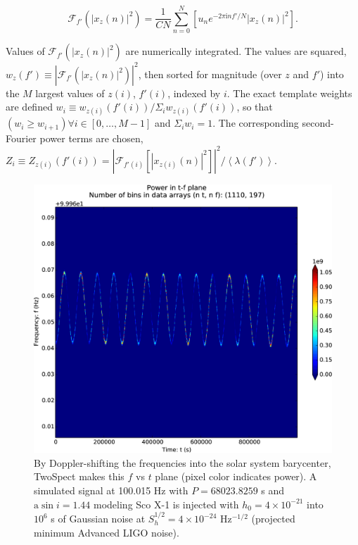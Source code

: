 \documentclass[12pt]{iopart}
\begin{document}
\begin{equation}
\mathcal{F}_{f'}(\left|x_z(n) \right|^2) = \frac{1}{CN} \sum\limits_{n=0}^N \left[u_n e^{-2\pi \mathrm{i} n f'/N} \left|x_z(n)\right|^2\right].
\label{fourier_transform_of_tfplane_power}
\end{equation}

Values of $\mathcal{F}_{f'}(\left|x_z(n) \right|^2)$ are numerically integrated.
The values are squared, $w_{z}(f') \equiv \left| \mathcal{F}_{f'}(\left|x_z(n) \right|^2) \right|^2$, then sorted for magnitude (over $z$ and $f'$) into the $M$ largest values of $z(i)$, $f'(i)$, indexed by $i$.
The exact template weights are defined $w_i \equiv w_{z(i)}\left(f'(i)\right) / \Sigma_i w_{z(i)} \left(f'(i) \right)$, so that $(w_i \geq w_{i+1}) \forall i\in [0,\ldots, M-1]$ and $\Sigma_i w_i = 1$.
The corresponding second-Fourier power terms are chosen, $Z_i \equiv Z_{z(i)}\left(f'(i)\right) = \left|\mathcal{F}_{f'(i)}[|x_{z(i)}(n)|^2] \right|^2/\left<\lambda(f') \right>$.


\begin{figure}
\begin{center}
\includegraphics[keepaspectratio,height=0.35\paperheight]{plots/tfplane-4e21-on-4e24.eps}
\caption{By Doppler-shifting the frequencies into the solar system barycenter, TwoSpect makes this $f$ vs $t$ plane (pixel color indicates power). A simulated signal at 100.015 Hz with $P = 68023.8259$ s and $\mathrm{a} \sin i = 1.44$ modeling Sco X-1 is injected with $h_0 = 4\times 10^{-21}$ into $10^6$ s of Gaussian noise at $S^{1/2}_{h} = 4 \times 10^{-24}$ Hz$^{-1/2}$ (projected minimum Advanced LIGO noise).}
\label{tfplane-figure}
\end{center}
\end{figure}
\end{document}
